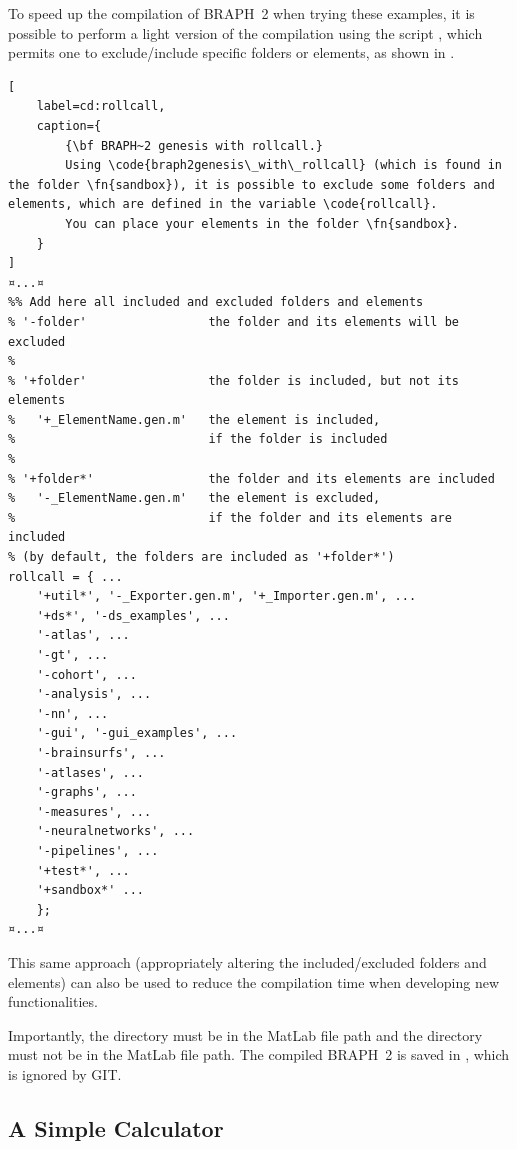 \documentclass{tufte-handout}
\begin{document}
\begin{fullwidth}
\begin{tcolorbox}[
	title=Light compilation of BRAPH~2
]
To speed up the compilation of BRAPH~2 when trying these examples, it is possible to perform a light version of the compilation using the script , which permits one to exclude/include specific folders or elements, as shown in .

\begin{lstlisting}[
	label=cd:rollcall,
	caption={
		{\bf BRAPH~2 genesis with rollcall.}
		Using \code{braph2genesis\_with\_rollcall} (which is found in the folder \fn{sandbox}), it is possible to exclude some folders and elements, which are defined in the variable \code{rollcall}.
		You can place your elements in the folder \fn{sandbox}.
	}
]
¤...¤
%% Add here all included and excluded folders and elements
% '-folder'                 the folder and its elements will be excluded
%
% '+folder'                 the folder is included, but not its elements
%   '+_ElementName.gen.m'   the element is included,
%                           if the folder is included
%
% '+folder*'                the folder and its elements are included
%   '-_ElementName.gen.m'   the element is excluded,
%                           if the folder and its elements are included
% (by default, the folders are included as '+folder*')
rollcall = { ...
    '+util*', '-_Exporter.gen.m', '+_Importer.gen.m', ...
    '+ds*', '-ds_examples', ...
    '-atlas', ...
    '-gt', ...
    '-cohort', ...
    '-analysis', ...
    '-nn', ...
    '-gui', '-gui_examples', ...
    '-brainsurfs', ...
    '-atlases', ...
    '-graphs', ...
    '-measures', ...
    '-neuralnetworks', ...
    '-pipelines', ...
    '+test*', ...
    '+sandbox*' ...
    };
¤...¤
\end{lstlisting}

This same approach (appropriately altering the included/excluded folders and elements) can also be used to reduce the compilation time when developing new functionalities.

Importantly, the directory  must be in the MatLab file path and the directory  must not be in the MatLab file path.
The compiled BRAPH~2 is saved in , which is ignored by GIT.
\end{tcolorbox}
\end{fullwidth}

\subsection{A Simple Calculator}
\end{document}
